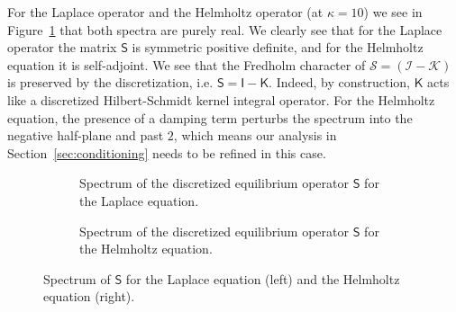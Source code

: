 \documentclass[final,onefignum,onetabnum]{siamart250211}
\newcommand{\mtx}[1]{\bm{\mathsf{#1}}}
\theoremstyle{definition}
\begin{document}
For the Laplace operator and the Helmholtz operator (at $\kappa = 10$) we see in Figure~\ref{fig:eigValsLaplHelm} that both spectra are purely real. We clearly see that for the Laplace operator the matrix $\mtx{S}$ is symmetric positive definite, and for the Helmholtz equation it is self-adjoint. We see that the Fredholm character of $\mathcal{S}=(\mathcal{I}-\mathcal{K})$ is preserved by the discretization, i.e. $\mtx{S}=\mtx{I}-\mtx{K}$. Indeed, by construction, $\mtx{K}$ acts like a discretized Hilbert-Schmidt kernel integral operator. For the Helmholtz equation, the presence of a damping term perturbs the spectrum into the negative half-plane and past $2$, which means our analysis in Section~\ref{sec:conditioning} needs to be refined in this case.
\begin{figure}[H]
    \centering
    \begin{subfigure}{.48\linewidth}
    \caption{Spectrum of the discretized equilibrium operator $\mtx{S}$ for the Laplace equation.}
    \end{subfigure}
\hfill
\begin{subfigure}{.48\linewidth}
    \caption{Spectrum of the discretized equilibrium operator $\mtx{S}$ for the Helmholtz equation.}
    \end{subfigure}    
    \caption{Spectrum of $\mtx{S}$ for the Laplace equation (left) and the Helmholtz equation (right).}
    \label{fig:eigValsLaplHelm}
\end{figure}
\end{document}
